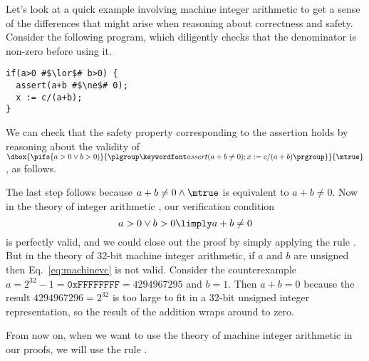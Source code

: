 \documentclass[11pt,twoside]{scrartcl}
\begin{document}
Let's look at a quick example involving machine integer arithmetic to get a sense of the differences that might arise when reasoning about correctness and safety. Consider the following program, which diligently checks that the denominator is non-zero before using it.
\begin{lstlisting}[basicstyle=\small,style=customjava,escapechar=\#]
if(a>0 #$\lor$# b>0) {
  assert(a+b #$\ne$# 0);
  x := c/(a+b);
}
\end{lstlisting}
We can check that the safety property corresponding to the assertion holds by reasoning about the validity of $\dbox{\pifs{a>0 \lor b>0)}{\plgroup\passert{a+b\ne0};x:=c/(a+b)\prgroup}}{\mtrue}$, as follows.
\begin{sequentdeduction}
 {
}
\end{sequentdeduction}
The last step follows because $a+b\ne0 \land \mtrue$ is equivalent to $a+b\ne0$. Now in the theory of integer arithmetic , our verification condition
\begin{equation}
\label{eq:machinevc}
a>0 \lor b>0 \limply a+b\ne0
\end{equation}
is perfectly valid, and we could close out the proof by simply applying the rule . But in the theory of 32-bit machine integer arithmetic, if $a$ and $b$ are unsigned then Eq.~\ref{eq:machinevc} is not valid. Consider the counterexample $a = 2^{32}-1 = \texttt{0xFFFFFFFF} = 4294967295$ and $b=1$. Then $a+b=0$ because the result $4294967296 = 2^{32}$ is too large to fit in a 32-bit unsigned integer representation, so the result of the addition wraps around to zero.

From now on, when we want to use the theory of machine integer arithmetic in our proofs, we will use the rule .
\end{document}
